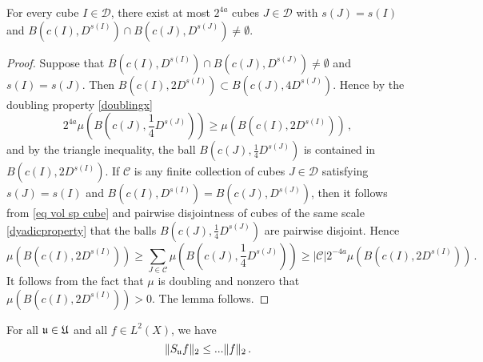 \begin{lemma}
    \label{lem aux overlap}
    For every cube $I \in \mathcal{D}$, there exist at most $2^{4a}$ cubes $J \in \mathcal{D}$ with $s(J) = s(I)$ and $B(c(I), D^{s(I)}) \cap B(c(J), D^{s(J)}) \ne \emptyset$.
\end{lemma}

\begin{proof}
    Suppose that $B(c(I), D^{s(I)}) \cap B(c(J), D^{s(J)}) \ne \emptyset$ and $s(I) = s(J)$. Then $B(c(I), 2D^{s(I)}) \subset B(c(J), 4D^{s(J)})$. Hence by the doubling property \eqref{doublingx}
    $$
        2^{4a}\mu(B(c(J), \frac{1}{4}D^{s(J)})) \ge \mu(B(c(I), 2D^{s(I)}))\,,
    $$
    and by the triangle inequality, the ball $B(c(J), \frac{1}{4}D^{s(J)})$ is contained in $B(c(I), 2D^{s(I)})$. If $\mathcal{C}$ is any finite collection of cubes $J \in \mathcal{D}$ satisfying $s(J) = s(I)$ and $B(c(I), D^{s(I)}) = B(c(J), D^{s(J)})$, then it follows from \eqref{eq vol sp cube} and pairwise disjointness of cubes of the same scale \eqref{dyadicproperty} that the balls $B(c(J), \frac{1}{4} D^{s(J)})$ are pairwise disjoint. Hence
    $$
        \mu(B(c(I), 2D^{s(I)})) \ge \sum_{J \in \mathcal{C}} \mu(B(c(J), \frac{1}{4}D^{s(J)})) \ge |\mathcal{C}| 2^{-4a} \mu(B(c(I), 2D^{s(I)}))\,.
    $$
    It follows from the fact that $\mu$ is doubling and nonzero that $\mu(B(c(I), 2D^{s(I)})) > 0$. The lemma follows.
\end{proof}

\begin{lemma}
    For all $\mathfrak u \in \mathfrak U$ and all $f \in L^2(X)$, we have
    \begin{equation}
        \label{eq S bound}
        \|S_{\mathfrak u}f\|_2 \le ... \|f\|_2\,.
    \end{equation}
\end{lemma}

